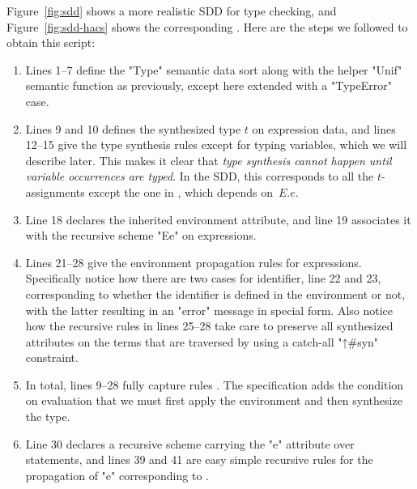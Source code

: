 \documentclass[11pt]{article} %
\begin{document}
\begin{example}
  Figure~\ref{fig:sdd} shows a more realistic SDD for type checking, and Figure~\ref{fig:sdd-hacs}
  shows the corresponding \HAX. Here are the steps we followed to obtain this script:
  \begin{enumerate}

  \item Lines 1--7 define the "Type" semantic data sort along with the helper "Unif" semantic
    function as previously, except here extended with a "TypeError" case.

  \item Lines 9 and 10 defines the synthesized type $t$ on expression data, and lines 12--15 give
    the type synthesis rules except for typing variables, which we will describe later. This makes
    it clear that \emph{type synthesis cannot happen until variable occurrences are typed}. In the
    SDD, this corresponds to all the $t$-assignments except the one in , which depends
    on~$E.e$.

  \item Line 18 declares the inherited environment attribute, and line 19 associates it with the
    recursive scheme "Ee" on expressions.

  \item Lines 21--28 give the environment propagation rules for expressions. Specifically notice how
    there are two cases for identifier, line 22 and 23, corresponding to whether the identifier is
    defined in the environment or not, with the latter resulting in an "error" message in special
    \HAX form. Also notice how the recursive rules in lines 25--28 take care to preserve all
    synthesized attributes on the terms that are traversed by using a catch-all "↑#syn" constraint.

  \item In total, lines 9--28 fully capture rules . The \HAX specification adds the
    condition on evaluation that we must first apply the environment and then synthesize the type.

  \item Line 30 declares a recursive scheme carrying the "e" attribute over statements, and lines 39
    and 41 are easy simple recursive rules for the propagation of "e" corresponding to
    .


\end{enumerate}
\end{example}
\end{document}
